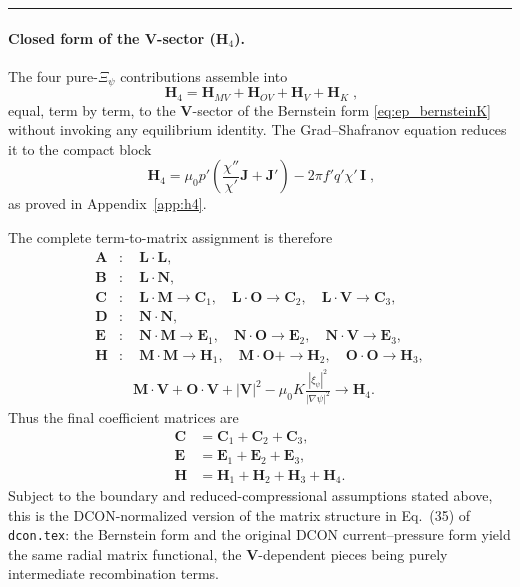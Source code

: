 \documentclass[10pt,a4paper]{article}
\numberwithin{equation}{section}
\begin{document}
\medskip
\noindent\rule{\linewidth}{0.4pt}
\paragraph{Closed form of the $\mathbf V$-sector ($\mathbf H_4$).}

The four pure-$\Xi_\psi$ contributions assemble into
\begin{equation}
\boxed{\;\mathbf H_4=\mathbf H_{MV}+\mathbf H_{OV}+\mathbf H_V+\mathbf H_K\;,}
\end{equation}
equal, term by term, to the $\mathbf V$-sector of the Bernstein form
\eqref{eq:ep_bernsteinK} without invoking any equilibrium identity.  The
Grad--Shafranov equation reduces it to the compact block
\begin{equation}
\boxed{\;
\mathbf H_4=\mu_0p'\left(\frac{\chi''}{\chi'}\mathbf J+\mathbf J'\right)
-2\pi f'q'\chi'\,\mathbf I\;,}
\end{equation}
as proved in Appendix~\ref{app:h4}.

The complete term-to-matrix assignment is therefore
\begin{equation}
\boxed{
\begin{aligned}
\mathbf A &: \quad \mathbf L\!\cdot\mathbf L,\\
\mathbf B &: \quad \mathbf L\!\cdot\mathbf N,\\
\mathbf C &: \quad
\mathbf L\!\cdot\mathbf M\to\mathbf C_1,\quad
\mathbf L\!\cdot\mathbf O\to\mathbf C_2,\quad
\mathbf L\!\cdot\mathbf V\to\mathbf C_3,\\
\mathbf D &: \quad \mathbf N\!\cdot\mathbf N,\\
\mathbf E &: \quad
\mathbf N\!\cdot\mathbf M\to\mathbf E_1,\quad
\mathbf N\!\cdot\mathbf O\to\mathbf E_2,\quad
\mathbf N\!\cdot\mathbf V\to\mathbf E_3,\\
\mathbf H &: \quad
\mathbf M\!\cdot\mathbf M\to\mathbf H_1,\quad
\mathbf M\!\cdot\mathbf O+\to\mathbf H_2,\quad
\mathbf O\!\cdot\mathbf O\to\mathbf H_3,\\
&\quad
\mathbf M\!\cdot\mathbf V
+\mathbf O\!\cdot\mathbf V
+|\mathbf V|^2
-\mu_0K\frac{|\xi_\psi|^2}{|\nabla\psi|^2}
\to\mathbf H_4 .
\end{aligned}
}
\end{equation}
Thus the final coefficient matrices are
\begin{equation}
\boxed{
\begin{aligned}
\mathbf C&=\mathbf C_1+\mathbf C_2+\mathbf C_3, \\
\mathbf E&=\mathbf E_1+\mathbf E_2+\mathbf E_3, \\
\mathbf H&=\mathbf H_1+\mathbf H_2+\mathbf H_3+\mathbf H_4.
\end{aligned}
}
\end{equation}
Subject to the boundary and reduced-compressional assumptions stated above,
this is the DCON-normalized version of the matrix structure in Eq.~(35) of
\texttt{dcon.tex}: the Bernstein form and the original DCON current--pressure
form yield the same radial matrix functional, the $\mathbf V$-dependent pieces
being purely intermediate recombination terms.
\end{document}
